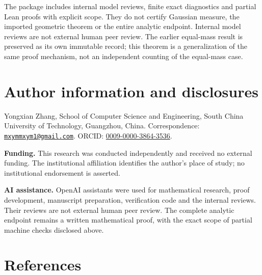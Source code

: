 \documentclass[
  11pt,
]{article}
\begin{document}
The package includes internal model reviews, finite exact diagnostics
and partial Lean proofs with explicit scope. They do not certify
Gaussian measure, the imported geometric theorem or the entire analytic
endpoint. Internal model reviews are not external human peer review. The
earlier equal-mass result is preserved as its own immutable record; this
theorem is a generalization of the same proof mechanism, not an
independent counting of the equal-mass case.

\section{Author information and
disclosures}\label{author-information-and-disclosures}

Yongxian Zhang, School of Computer Science and Engineering, South China
University of Technology, Guangzhou, China. Correspondence:
\href{mailto:mxymmxym1@gmail.com}{\nolinkurl{mxymmxym1@gmail.com}}.
ORCID:
\href{https://orcid.org/0009-0000-3864-3536}{0009-0000-3864-3536}.

\textbf{Funding.} This research was conducted independently and received
no external funding. The institutional affiliation identifies the
author's place of study; no institutional endorsement is asserted.

\textbf{AI assistance.} OpenAI assistants were used for mathematical
research, proof development, manuscript preparation, verification code
and the internal reviews. Their reviews are not external human peer
review. The complete analytic endpoint remains a written mathematical
proof, with the exact scope of partial machine checks disclosed above.

\section{References}\label{references}
\end{document}
